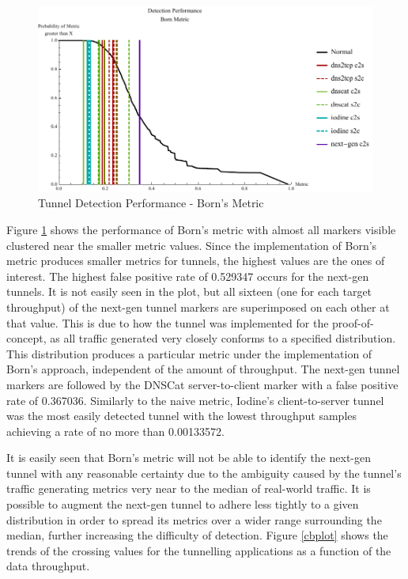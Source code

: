 \documentclass[12pt]{report}
\theoremstyle{remark}
\theoremstyle{definition}
\theoremstyle{definition}
\theoremstyle{definition}
\begin{document}
\begin{figure}
\centering
\includegraphics[width=\textwidth]{../figures/mpbv.pdf}
\caption[Tunnel Detection Performance - Born's Metric]{Tunnel Detection 
Performance - Born's Metric}
\label{mpbv}
\end{figure}

Figure \ref{mpbv} shows the performance of Born's metric with almost all markers
visible clustered near the smaller metric values. Since the implementation of
Born's metric produces smaller metrics for tunnels, the highest values are the
ones of interest. The highest false positive rate of 0.529347 occurs for the
next-gen tunnels. It is not easily seen in the plot, but all sixteen (one for
each target throughput) of the next-gen tunnel markers are superimposed on each
other at that value. This is due to how the tunnel was implemented for the
proof-of-concept, as all traffic generated very closely conforms to a specified
distribution. This distribution produces a particular metric under the
implementation of Born's approach, independent of the amount of throughput. The
next-gen tunnel markers are followed by the DNSCat server-to-client marker with
a false positive rate of 0.367036. Similarly to the naive metric, Iodine's
client-to-server tunnel was the most easily detected tunnel with the lowest
throughput samples achieving a rate of no more than 0.00133572.

It is easily seen that Born's metric will not be able to identify the next-gen
tunnel with any reasonable certainty due to the ambiguity caused by the tunnel's
traffic generating metrics very near to the median of real-world traffic. It is
possible to augment the next-gen tunnel to adhere less tightly to a given
distribution in order to spread its metrics over a wider range surrounding the
median, further increasing the difficulty of detection. Figure \ref{cbplot}
shows the trends of the crossing values for the tunnelling applications as a
function of the data throughput.
\end{document}
